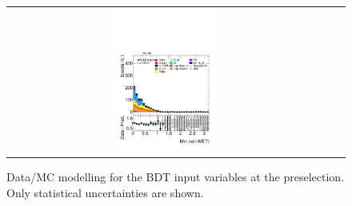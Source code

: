 \begin{figure}[htbp]
\begin{tabular}{@{}c c c@{}}
    \includegraphics[width=0.33\textwidth]{images/modelling_tmva_vars/plot_ditau_met_min_dphi_hh_tth.pdf}
  \end{tabular}

  \caption{Data/MC modelling for the \ttH BDT input variables at the \ttHtt preselection. Only statistical uncertainties are shown.}
  \label{tth_vars_modelling_2}
\end{figure}

